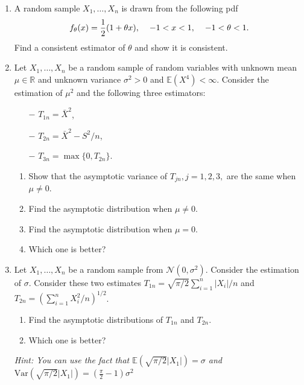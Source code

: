 \documentclass[12pt]{extarticle}
\newcommand{\E}{\mathbb E}
\begin{document}
  \begin{enumerate}
  	\item A random sample $X_1,\ldots,X_n$ is drawn from the following pdf
  	$$f_\theta(x) = \dfrac{1}{2}(1+\theta x), \hskip .4cm -1<x<1, \hskip .4cm -1<\theta<1.$$
  	Find a consistent estimator of $\theta$ and show it is consistent.
  	\vskip 4cm
  	\item Let $X_1,\ldots,X_n$ be a random sample of random variables with unknown mean $\mu\in\mathbb R$ and unknown variance $\sigma^2 > 0$ and $\E (X^4)<\infty$. Consider the estimation of $\mu^2$ and the following three estimators:
  	\begin{itemize}
  		\item[$-$] $T_{1n} = \bar{X}^2$,
  		\item[$-$] $T_{2n} = \bar{X}^2 - S^2/n$,
  		\item[$-$] $T_{3n} = \max\{0, T_{2n}\}$.  
  	\end{itemize}
  	\begin{enumerate}
  		\item Show that the asymptotic variance of $T_{jn}, j = 1,2,3,$ are the same when $\mu \neq 0$.
  	    \item Find the asymptotic distribution when $\mu \neq 0$.
  	       \item Find the asymptotic distribution when $\mu = 0$.
  	       \item Which one is better?
  	\end{enumerate}
  	\vskip 4cm
  	\item Let $X_1,\ldots,X_n$ be a random sample from $\mathcal N(0,\sigma^2)$. Consider the estimation of $\sigma$. Consider these two estimates  $T_{1n} = \sqrt{\pi/2}\sum_{i=1}^n |X_i|/n$ and $T_{2n} = (\sum_{i=1}^nX_i^2/n)^{1/2}$.
  	
  
  	\begin{enumerate}
  		\item Find the asymptotic distributions of $T_{1n}$ and $T_{2n}$.
  		\item Which one is better? 
  	\end{enumerate}
  	\textit{Hint: You can use the fact that $\E(\sqrt{\pi/2}|X_1|) = \sigma$ and $\text{Var}(\sqrt{\pi/2}|X_1|) = (\frac{\pi}{2} - 1)\sigma^2$}
  
  \end{enumerate}
\end{document}
